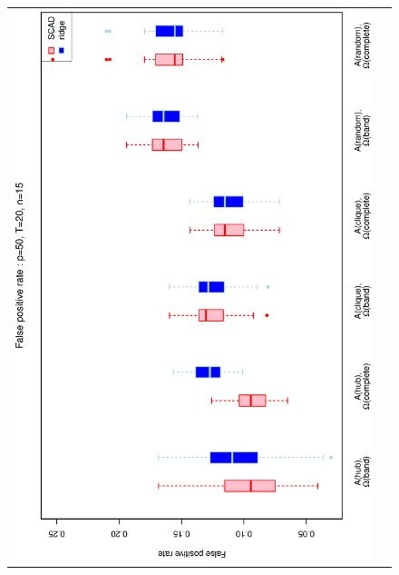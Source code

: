 \begin{figure}[h!]
\centering
\begin{tabular}{cc}
\includegraphics[scale=0.45,angle=270]{ROCfpr50T20N15_5.eps}
\\

\end{tabular}
\end{figure}
